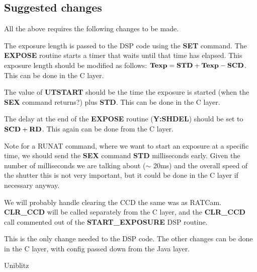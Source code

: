 \documentclass[10pt,a4paper]{article}
\begin{document}
\subsection{Suggested changes}

All the above requires the following changes to be made.

The exposure length is passed to the DSP code using the {\bf SET} command. The {\bf EXPOSE} routine starts a timer
that waits until that time has elapsed. This exposure length should be modified as follows:
${\bf Texp} = {\bf STD} + {\bf Texp} - {\bf SCD}$. This can be done in the C layer.

The value of {\bf UTSTART} should be the time the exposure is started (when the {\bf SEX} command returns?)
 plus {\bf STD}. This can be done in the C layer.

The delay at the end of the {\bf EXPOSE} routine ({\bf Y:SHDEL}) should be set to ${\bf SCD} + {\bf RD}$.
This again can be done from the C layer.

Note for a RUNAT command, where we want to start an exposure at a specific time, we should send the
{\bf SEX} command {\bf STD} milliseconds early. Given the number of milliseconds we are talking about ($\sim$ 20ms)
and the overall speed of the shutter this is not very important, but it could be done in the C layer if necessary anyway.

We will probably handle clearing the CCD the same was as RATCam. {\bf CLR\_CCD} will be called separately from the 
C layer, and the {\bf CLR\_CCD} call commented out of the {\bf START\_EXPOSURE} DSP routine. 

This is the only change needed to the DSP code. The other changes can be done in the C layer, with
config passed down from the Java layer.

\begin{thebibliography}{99}

Uniblitz 

\end{thebibliography}
\end{document}
